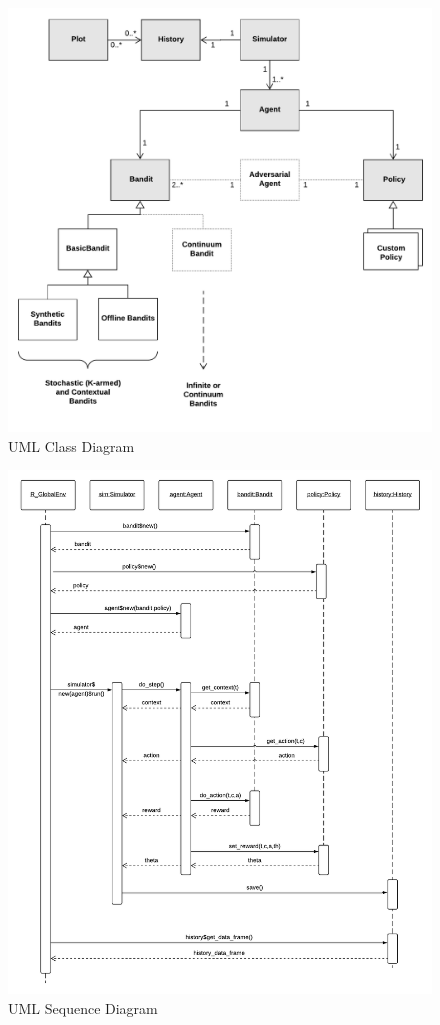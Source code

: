 \documentclass{jss}\usepackage[]{graphicx}\usepackage[]{color}
\begin{document}
\begin{figure}[H]
  \centering
    \includegraphics[width=.99\textwidth]{fig/contextual_class}

      \caption{ UML Class Diagram}
          \label{fig:contextual_class}
\end{figure}

\begin{figure}[H]
  \centering
    \includegraphics[width=.99\textwidth]{fig/contextual_sequence}

      \caption{ UML Sequence Diagram}
      \label{fig:contextual_sequence}
\end{figure}
\end{document}
